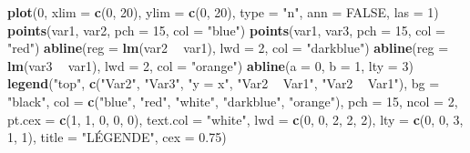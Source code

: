 \documentclass[]{article}
\newenvironment{Shaded}{\begin{snugshade}}{\end{snugshade}}
\newcommand{\DataTypeTok}[1]{\textcolor[rgb]{0.13,0.29,0.53}{#1}}
\newcommand{\DecValTok}[1]{\textcolor[rgb]{0.00,0.00,0.81}{#1}}
\newcommand{\FloatTok}[1]{\textcolor[rgb]{0.00,0.00,0.81}{#1}}
\newcommand{\KeywordTok}[1]{\textcolor[rgb]{0.13,0.29,0.53}{\textbf{#1}}}
\newcommand{\NormalTok}[1]{#1}
\newcommand{\OperatorTok}[1]{\textcolor[rgb]{0.81,0.36,0.00}{\textbf{#1}}}
\newcommand{\OtherTok}[1]{\textcolor[rgb]{0.56,0.35,0.01}{#1}}
\newcommand{\StringTok}[1]{\textcolor[rgb]{0.31,0.60,0.02}{#1}}
\begin{document}
\begin{Shaded}
\begin{Highlighting}[]
\KeywordTok{plot}\NormalTok{(}\DecValTok{0}\NormalTok{, }\DataTypeTok{xlim =} \KeywordTok{c}\NormalTok{(}\DecValTok{0}\NormalTok{, }\DecValTok{20}\NormalTok{), }\DataTypeTok{ylim =} \KeywordTok{c}\NormalTok{(}\DecValTok{0}\NormalTok{, }\DecValTok{20}\NormalTok{), }\DataTypeTok{type =} \StringTok{"n"}\NormalTok{, }\DataTypeTok{ann =} \OtherTok{FALSE}\NormalTok{, }\DataTypeTok{las =} \DecValTok{1}\NormalTok{)}
\KeywordTok{points}\NormalTok{(var1, var2, }\DataTypeTok{pch =} \DecValTok{15}\NormalTok{, }\DataTypeTok{col =} \StringTok{"blue"}\NormalTok{)}
\KeywordTok{points}\NormalTok{(var1, var3, }\DataTypeTok{pch =} \DecValTok{15}\NormalTok{, }\DataTypeTok{col =} \StringTok{"red"}\NormalTok{)}
\KeywordTok{abline}\NormalTok{(}\DataTypeTok{reg =} \KeywordTok{lm}\NormalTok{(var2 }\OperatorTok{~}\StringTok{ }\NormalTok{var1), }\DataTypeTok{lwd =} \DecValTok{2}\NormalTok{, }\DataTypeTok{col =} \StringTok{"darkblue"}\NormalTok{)}
\KeywordTok{abline}\NormalTok{(}\DataTypeTok{reg =} \KeywordTok{lm}\NormalTok{(var3 }\OperatorTok{~}\StringTok{ }\NormalTok{var1), }\DataTypeTok{lwd =} \DecValTok{2}\NormalTok{, }\DataTypeTok{col =} \StringTok{"orange"}\NormalTok{)}
\KeywordTok{abline}\NormalTok{(}\DataTypeTok{a =} \DecValTok{0}\NormalTok{, }\DataTypeTok{b =} \DecValTok{1}\NormalTok{, }\DataTypeTok{lty =} \DecValTok{3}\NormalTok{)}
\KeywordTok{legend}\NormalTok{(}\StringTok{"top"}\NormalTok{, }\KeywordTok{c}\NormalTok{(}\StringTok{"Var2"}\NormalTok{, }\StringTok{"Var3"}\NormalTok{, }\StringTok{"y = x"}\NormalTok{, }\StringTok{"Var2 ~ Var1"}\NormalTok{, }\StringTok{"Var2 ~ Var1"}\NormalTok{), }\DataTypeTok{bg =} \StringTok{"black"}\NormalTok{, }\DataTypeTok{col =} \KeywordTok{c}\NormalTok{(}\StringTok{"blue"}\NormalTok{, }\StringTok{"red"}\NormalTok{, }\StringTok{"white"}\NormalTok{, }\StringTok{"darkblue"}\NormalTok{, }\StringTok{"orange"}\NormalTok{), }\DataTypeTok{pch =} \DecValTok{15}\NormalTok{, }\DataTypeTok{ncol =} \DecValTok{2}\NormalTok{, }\DataTypeTok{pt.cex =} \KeywordTok{c}\NormalTok{(}\DecValTok{1}\NormalTok{, }\DecValTok{1}\NormalTok{, }\DecValTok{0}\NormalTok{, }\DecValTok{0}\NormalTok{, }\DecValTok{0}\NormalTok{), }\DataTypeTok{text.col =} \StringTok{"white"}\NormalTok{, }\DataTypeTok{lwd =} \KeywordTok{c}\NormalTok{(}\DecValTok{0}\NormalTok{, }\DecValTok{0}\NormalTok{, }\DecValTok{2}\NormalTok{, }\DecValTok{2}\NormalTok{, }\DecValTok{2}\NormalTok{), }\DataTypeTok{lty =} \KeywordTok{c}\NormalTok{(}\DecValTok{0}\NormalTok{, }\DecValTok{0}\NormalTok{, }\DecValTok{3}\NormalTok{, }\DecValTok{1}\NormalTok{, }\DecValTok{1}\NormalTok{), }\DataTypeTok{title =} \StringTok{"LÉGENDE"}\NormalTok{, }\DataTypeTok{cex =} \FloatTok{0.75}\NormalTok{)}
\end{Highlighting}
\end{Shaded}
\end{document}
